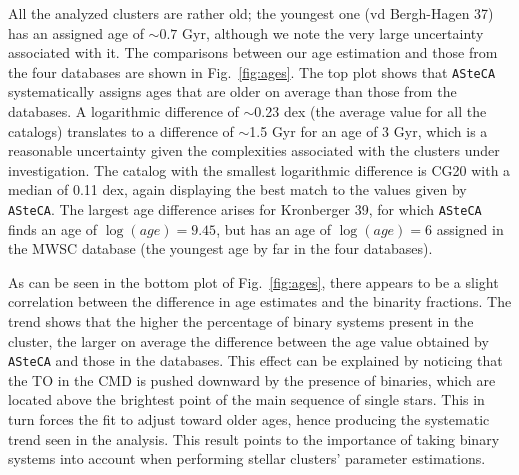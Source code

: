 \documentclass{aa}
\begin{document}
  All the analyzed clusters are rather old;  the youngest one (vd
  Bergh-Hagen 37) has an assigned   age of $\sim0.7$ Gyr, although we note the very
  large uncertainty associated with it.
  The comparisons between our age estimation and those from
  the four databases are shown in Fig.~\ref{fig:ages}. The top plot
  shows that \texttt{ASteCA} systematically assigns ages that are older on
  average than those from the databases.
  A logarithmic difference of $\sim$0.23 dex (the average value for
  all the catalogs) translates to a difference of $\sim$1.5 Gyr for
  an age of 3 Gyr, which is a reasonable uncertainty given the complexities
  associated with the clusters under investigation. The catalog with the
  smallest logarithmic difference is CG20 with a median of 0.11 dex, again
  displaying the best match to the values given by \texttt{ASteCA}.
  The largest age difference arises for Kronberger 39, for
  which \texttt{ASteCA} finds an age of $\log(age)=9.45$, but has an age of
  $\log(age)=6$ assigned in the MWSC database (the youngest age by far in the four
  databases).

  As can be seen in the bottom plot of Fig.~\ref{fig:ages}, there appears to be
  a slight correlation between the difference in age estimates and the
  binarity fractions. The trend shows that the higher the percentage of
  binary systems present in the cluster, the larger on average   the difference
  between the age value obtained by \texttt{ASteCA} and those in the
  databases. This  effect can be explained by noticing that the TO in the CMD
  is pushed downward by the presence of binaries, which are located above the
  brightest point of the main sequence of single stars. This in turn forces the
  fit to adjust toward  older ages, hence producing the systematic trend
  seen in the analysis. This result points to the importance of taking binary
  systems into account when performing stellar clusters' parameter estimations.
  \\
\end{document}
